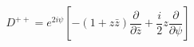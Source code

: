 \begin{equation}
D^{++}=e^{2i\psi}[-(1+z\bar{z})\frac{\partial}{\partial \bar{z}}+\frac{i}{2} z
\frac{\partial}{\partial \psi}]
\end{equation}


